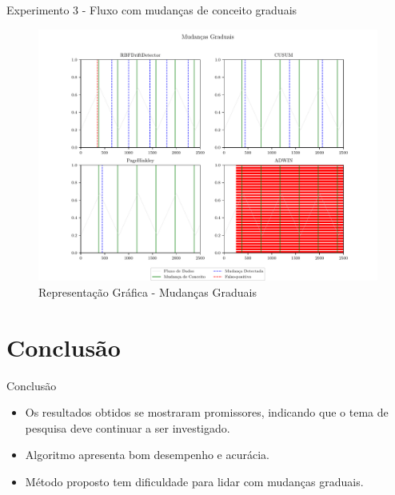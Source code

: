 \documentclass[10pt]{beamer}
\begin{document}
\begin{frame}{Experimento 3 - Fluxo com mudanças de conceito graduais}
    \begin{figure}[ht]
        \begin{center}
            \includegraphics[scale=0.45]{../text/imagens/gradual.pdf}
            \caption{Representação Gráfica - Mudanças Graduais}
            \label{fig:exp_gradual}
        \end{center}
        \end{figure}
\end{frame}

\section{Conclusão}

\begin{frame}{Conclusão}
    \begin{itemize}
        \item<1 -> Os resultados obtidos se mostraram promissores, indicando que o tema de pesquisa deve continuar a ser investigado.
        \item<2 -> Algoritmo apresenta bom desempenho e acurácia.
        \item<3 -> Método proposto tem dificuldade para lidar com mudanças graduais.
      \end{itemize}
\end{frame}
\end{document}
